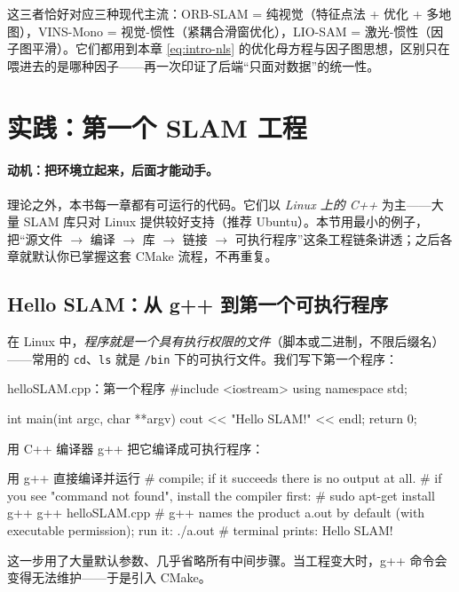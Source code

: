 \noindent 这三者恰好对应三种现代主流：ORB-SLAM = 纯视觉（特征点法 + 优化 + 多地图），VINS-Mono = 视觉-惯性（紧耦合滑窗优化），LIO-SAM = 激光-惯性（因子图平滑）。它们都用到本章 \cref{eq:intro-nls} 的优化母方程与因子图思想，区别只在喂进去的是哪种因子——再一次印证了后端“只面对数据”的统一性。

\section{实践：第一个 SLAM 工程}
\label{sec:intro-code}

\paragraph{动机：把环境立起来，后面才能动手。}
理论之外，本书每一章都有可运行的代码。它们以 \emph{Linux 上的 C++} 为主——大量 SLAM 库只对 Linux 提供较好支持（推荐 Ubuntu）。本节用最小的例子，把“源文件 $\to$ 编译 $\to$ 库 $\to$ 链接 $\to$ 可执行程序”这条工程链条讲透；之后各章就默认你已掌握这套 CMake 流程，不再重复。

\subsection{Hello SLAM：从 g++ 到第一个可执行程序}
\label{sec:intro-hello}
在 Linux 中，\emph{程序就是一个具有执行权限的文件}（脚本或二进制，不限后缀名）——常用的 \texttt{cd}、\texttt{ls} 就是 \texttt{/bin} 下的可执行文件。我们写下第一个程序：

\begin{codebox}[C++]{helloSLAM.cpp：第一个程序}
#include <iostream>
using namespace std;

int main(int argc, char **argv) {
    cout << "Hello SLAM!" << endl;
    return 0;
}
\end{codebox}

\noindent 用 C++ 编译器 g++ 把它编译成可执行程序：

\begin{codebox}[bash]{用 g++ 直接编译并运行}
# compile; if it succeeds there is no output at all.
# if you see "command not found", install the compiler first:
#   sudo apt-get install g++
g++ helloSLAM.cpp
# g++ names the product a.out by default (with executable permission); run it:
./a.out
# terminal prints: Hello SLAM!
\end{codebox}

\noindent 这一步用了大量默认参数、几乎省略所有中间步骤。当工程变大时，g++ 命令会变得无法维护——于是引入 CMake。

